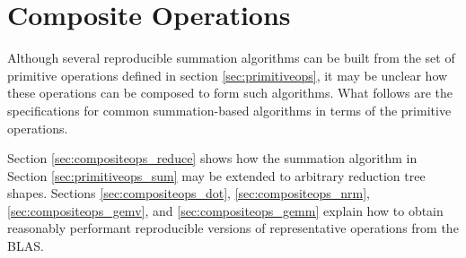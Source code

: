\section{Composite Operations}
  \label{sec:compositeops}
  Although several reproducible summation algorithms can be built from the set of primitive operations defined in section \ref{sec:primitiveops}, it may be unclear how these operations can be composed to form such algorithms. What follows are the specifications for common summation-based algorithms in terms of the primitive operations.

  Section \ref{sec:compositeops_reduce} shows how the summation algorithm in Section \ref{sec:primitiveops_sum} may be extended to arbitrary reduction tree shapes. Sections \ref{sec:compositeops_dot}, \ref{sec:compositeops_nrm}, \ref{sec:compositeops_gemv}, and \ref{sec:compositeops_gemm} explain how to obtain reasonably performant reproducible versions of representative operations from the BLAS.
    
    
    
    
    
